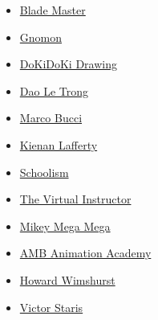 \documentclass[12pt]{article}
\begin{document}
\begin{itemize}
    \item \href{https://www.youtube.com/user/0oBlademastero0/featured}{Blade Master}
    \item \href{https://www.youtube.com/user/gnomonschool/featured}{Gnomon}
    \item \href{https://www.youtube.com/c/DoKiDoKiDrawing/featured}{DoKiDoKi Drawing}
    \item \href{https://www.youtube.com/c/DaoLeTrong/featured}{Dao Le Trong}
    \item \href{https://www.youtube.com/user/marcobucci/featured}{Marco Bucci}
    \item \href{https://www.youtube.com/channel/UCmc-Zy6PxGcaVq8OlYVjX8A/featured}{Kienan Lafferty}
    \item \href{https://www.youtube.com/user/skiptothelove/featured}{Schoolism}
    \item \href{https://www.youtube.com/c/thevirtualinstructor}{The Virtual Instructor}
    \item \href{https://www.youtube.com/c/mikeymegamega}{Mikey Mega Mega}
    \item \href{https://www.youtube.com/c/AMBAnimationAcademy}{AMB Animation Academy}
    \item \href{https://www.youtube.com/c/HowardWimshurst}{Howard Wimshurst}
    \item \href{https://youtube.com/c/VictorStaris}{Victor Staris}
\end{itemize}
\end{document}

